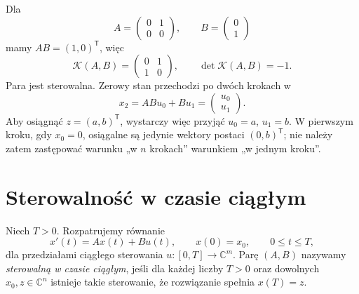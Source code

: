\begin{przyklad}
\label{prz:lin25-chain}
Dla
\[
 A=\begin{pmatrix}0&1\\0&0\end{pmatrix},
 \qquad
 B=\begin{pmatrix}0\\1\end{pmatrix}
\]
mamy
\(AB=(1,0)^{\mathsf T}\),
więc
\[
 \mathcal K(A,B)
 =\begin{pmatrix}0&1\\1&0\end{pmatrix},
 \qquad
 \det\mathcal K(A,B)=-1.
\]
Para jest sterowalna.
Zerowy stan przechodzi
po dwóch krokach w
\[
 x_2=ABu_0+Bu_1
     =\begin{pmatrix}u_0\\u_1\end{pmatrix}.
\]
Aby osiągnąć \(z=(a,b)^{\mathsf T}\),
wystarczy więc przyjąć
\(u_0=a\), \(u_1=b\).
W pierwszym kroku,
gdy \(x_0=0\),
osiągalne są jedynie
wektory postaci \((0,b)^{\mathsf T}\);
nie należy zatem zastępować
warunku „w \(n\) krokach”
warunkiem „w jednym kroku”.
\end{przyklad}

\section{Sterowalność w czasie ciągłym}
\label{sec:lin25-reach-cont}

\begin{definicja}
\label{def:lin25-cont-system}
Niech \(T>0\).
Rozpatrujemy równanie
\[
 x'(t)=Ax(t)+Bu(t),\qquad
 x(0)=x_0,\qquad 0\le t\le T,
\]
dla przedziałami ciągłego
sterowania
\(u\colon[0,T]\to\mathbb C^m\).
Parę \((A,B)\)
nazywamy \emph{sterowalną
w czasie ciągłym}, jeśli
dla każdej liczby \(T>0\)
oraz dowolnych \(x_0,z\in\mathbb C^n\)
istnieje takie sterowanie,
że rozwiązanie spełnia \(x(T)=z\).
\end{definicja}

